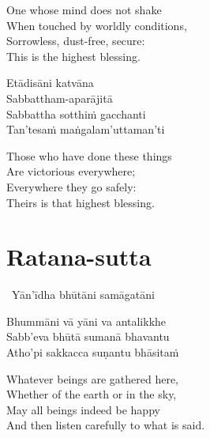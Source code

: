 \begin{english-verses}
  One whose mind does not shake\\
  When touched by worldly conditions,\\
  Sorrowless, dust-free, secure:\\
  This is the highest blessing.
\end{english-verses}

\begin{pali-hang-continued}
  Etādisāni katvāna\\
  Sabbattham-aparājitā\\
  Sabbattha sotthiṁ gacchanti\\
  Tan'tesaṁ maṅgalam'uttaman'ti
\end{pali-hang-continued}

\begin{english-verses}
  Those who have done these things\\
  Are victorious everywhere;\\
  Everywhere they go safely:\\
  Theirs is that highest blessing.
\end{english-verses}

\suttaRef{[Snp 2.4]}

\section{Ratana-sutta}
\label{ratana-sutta}

\begin{pali-leader}
  \anglebracketleft\ \hspace{-0.5mm}Yān'īdha bhūtāni samāgatāni \hspace{-0.5mm}\anglebracketright\
\end{pali-leader}
\begin{pali-hangtogether}
  Bhummāni vā yāni va antalikkhe\\
  Sabb'eva bhūtā sumanā bhavantu\\
  Atho'pi sakkacca suṇantu bhāsitaṁ
\end{pali-hangtogether}

\begin{english-verses}
  Whatever beings are gathered here,\\
  Whether of the earth or in the sky,\\
  May all beings indeed be happy\\
  And then listen carefully to what is said.
\end{english-verses}

